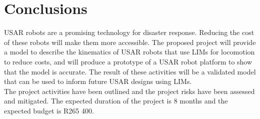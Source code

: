 \chapter{Conclusions}
USAR robots are a promising technology for disaster response. Reducing the cost of these robots will make them more accessible. The proposed project will provide a model to describe the kinematics of USAR robots that use LIMs for locomotion to reduce costs, and will produce a prototype of a USAR robot platform to show that the model is accurate. The result of these activities will be a validated model that can be used to inform future USAR designs using LIMs.\\

\noindent The project activities have been outlined and the project risks have been assessed and mitigated. The expected duration of the project is 8 months and the expected budget is R265 400.  
